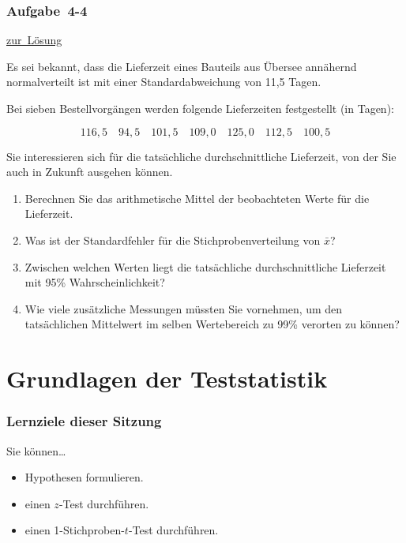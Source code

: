 \documentclass[
  11pt,
  ngerman,
  a4paper,
]{report}
\providecommand{\tightlist}{%
  \setlength{\itemsep}{0pt}\setlength{\parskip}{0pt}}
\begin{document}
\hypertarget{aufgabe-4-4}{%
\subsection{Aufgabe~4-4}\label{aufgabe-4-4}}

\protect\hyperlink{loesung-4-4}{zur~Lösung}

Es sei bekannt, dass die Lieferzeit eines Bauteils aus Übersee annähernd normalverteilt ist mit einer Standardabweichung von 11,5 Tagen.

Bei sieben Bestellvorgängen werden folgende Lieferzeiten festgestellt (in Tagen):

\[116{,}5\quad 94{,}5\quad101{,}5\quad109{,}0\quad125{,}0\quad112{,}5\quad100{,}5\]

Sie interessieren sich für die tatsächliche durchschnittliche Lieferzeit, von der Sie auch in Zukunft ausgehen können.

\begin{enumerate}
\def\labelenumi{\alph{enumi})}
\tightlist
\item
  Berechnen Sie das arithmetische Mittel der beobachteten Werte für die Lieferzeit.
\item
  Was ist der Standardfehler für die Stichprobenverteilung von \(\bar{x}\)?
\item
  Zwischen welchen Werten liegt die tatsächliche durchschnittliche Lieferzeit mit 95\% Wahrscheinlichkeit?
\item
  Wie viele zusätzliche Messungen müssten Sie vornehmen, um den tatsächlichen Mittelwert im selben Wertebereich zu 99\% verorten zu können?
\end{enumerate}

\hypertarget{grundlagen-der-teststatistik}{%
\chapter{Grundlagen der Teststatistik}\label{grundlagen-der-teststatistik}}

\hypertarget{lernziele-dieser-sitzung-4}{%
\subsection*{Lernziele dieser Sitzung}\label{lernziele-dieser-sitzung-4}}

Sie können\ldots{}

\begin{itemize}
\tightlist
\item
  Hypothesen formulieren.
\item
  einen \(z\)-Test durchführen.
\item
  einen 1-Stichproben-\(t\)-Test durchführen.
\end{itemize}
\end{document}
